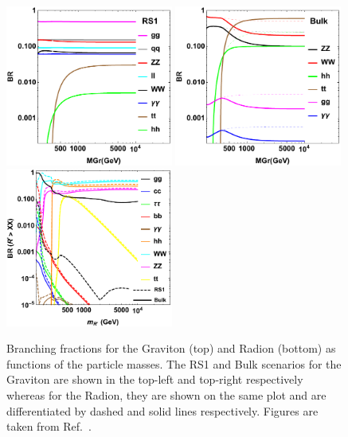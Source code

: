 \begin{figure}
  \centering
  \includegraphics[width=0.49\textwidth]{Figures/Theory/WED/RSGravitonBRanal.pdf}
  \includegraphics[width=0.49\textwidth]{Figures/Theory/WED/BulkGravitonBRanalWitTop.pdf}
  \includegraphics[width=0.49\textwidth]{Figures/Theory/WED/BR_eHDecay.pdf}
  \caption[Graviton and Radion Branching Fractions]{Branching fractions for the Graviton (top) and Radion (bottom) as functions of the particle masses. The RS1 and Bulk scenarios for the Graviton are shown in the top-left and top-right respectively whereas for the Radion, they are shown on the same plot and are differentiated by dashed and solid lines respectively. Figures are taken from Ref.~\cite{Carvalho:2014lsg}.}\label{fig:WED_BF}
\end{figure}


